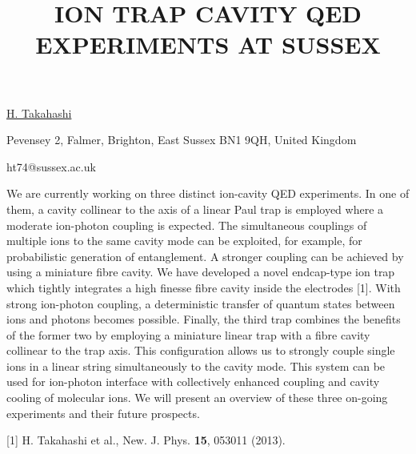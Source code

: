 \title{ION TRAP CAVITY QED EXPERIMENTS AT SUSSEX}

\underline{H. Takahashi} 

{\normalsize{\vspace{-4mm}
Pevensey 2, Falmer,
Brighton, East Sussex BN1 9QH,
United Kingdom 

\email ht74@sussex.ac.uk}}

We are currently working on three distinct ion-cavity QED experiments. In one of them, a cavity collinear to the axis of a linear Paul trap is employed where a moderate ion-photon coupling is expected. The simultaneous couplings of multiple ions to the same cavity mode can be exploited, for example, for probabilistic generation of entanglement. A stronger coupling can be achieved by using a miniature fibre cavity. We have developed a novel endcap-type ion trap which tightly integrates a high finesse fibre cavity inside the electrodes [1]. With strong ion-photon coupling, a deterministic transfer of quantum states between ions and photons becomes possible. Finally, the third trap combines the benefits of the former two by employing a miniature linear trap with a fibre cavity collinear to the trap axis. This configuration allows us to strongly couple single ions in a linear string simultaneously to the cavity mode. This system can be used for ion-photon interface with
  collectively enhanced coupling and cavity cooling of molecular ions.
We will present an overview of these three on-going experiments and their future prospects.

{\normalsize
[1] H. Takahashi et al., New. J. Phys. \textbf{15}, 053011 (2013).
}

\vspace{\baselineskip}
